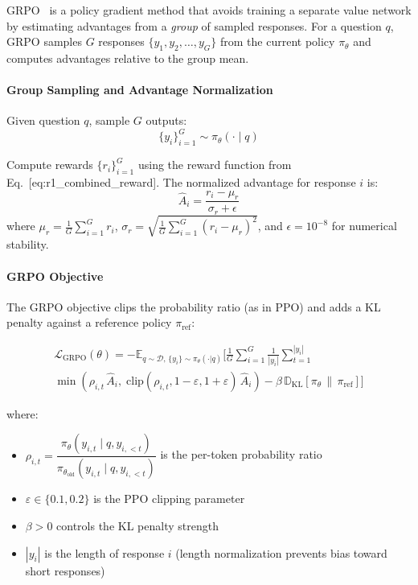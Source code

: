 GRPO~\cite{shao2024deepseekmath} is a policy gradient method that avoids training a separate value network by estimating advantages from a \emph{group} of sampled responses. For a question $q$, GRPO samples $G$ responses $\{y_1, y_2, \ldots, y_G\}$ from the current policy $\pi_\theta$ and computes advantages relative to the group mean.

\paragraph{Group Sampling and Advantage Normalization}
\label{group-sampling-and-advantage-normalization}

Given question $q$, sample $G$ outputs: 
\begin{equation}
    \{y_i\}_{i=1}^G \sim \pi_\theta(\cdot \mid q)
\end{equation}

Compute rewards $\{r_i\}_{i=1}^G$ using the reward function from Eq.~[eq:r1\_combined\_reward]. The normalized advantage for response $i$ is: 
\begin{equation}
    \hat{A}_i = \frac{r_i - \mu_r}{\sigma_r + \epsilon}
\end{equation}
 where $\mu_r = \frac{1}{G}\sum_{i=1}^G r_i$, $\sigma_r = \sqrt{\frac{1}{G}\sum_{i=1}^G (r_i - \mu_r)^2}$, and $\epsilon = 10^{-8}$ for numerical stability.

\paragraph{GRPO Objective}
\label{grpo-objective}

The GRPO objective clips the probability ratio (as in PPO) and adds a KL penalty against a reference policy $\pi_{\text{ref}}$:

\begin{multline}
\mathcal{L}_{\text{GRPO}}(\theta) = -\mathbb{E}_{q \sim \mathcal{D},\, \{y_i\} \sim \pi_\theta(\cdot|q)} \Bigg[ \frac{1}{G} \sum_{i=1}^{G} \frac{1}{|y_i|} \sum_{t=1}^{|y_i|} \\
\min\!\left( \rho_{i,t}\, \hat{A}_i,\; \text{clip}(\rho_{i,t}, 1{-}\varepsilon, 1{+}\varepsilon)\, \hat{A}_i \right) - \beta\, \mathbb{D}_{\mathrm{KL}}\!\left[\pi_\theta \,\|\, \pi_{\text{ref}}\right] \Bigg]
\label{eq:grpo_full}
\end{multline}

where:

\begin{itemize}
  \item $\rho_{i,t} = \dfrac{\pi_\theta(y_{i,t} \mid q, y_{i,<t})}{\pi_{\theta_{\text{old}}}(y_{i,t} \mid q, y_{i,<t})}$ is the per-token probability ratio
  \item $\varepsilon \in \{0.1, 0.2\}$ is the PPO clipping parameter
  \item $\beta > 0$ controls the KL penalty strength
  \item $|y_i|$ is the length of response $i$ (length normalization prevents bias toward short responses)
\end{itemize}

